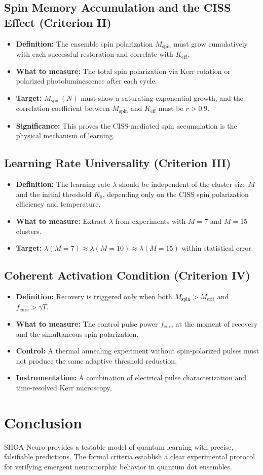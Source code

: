 \documentclass[12pt]{article}
\begin{document}
\subsection{Spin Memory Accumulation and the CISS Effect (Criterion II)}
\begin{itemize}
    \item \textbf{Definition:} The ensemble spin polarization $M_{\text{spin}}$ must grow cumulatively with each successful restoration and correlate with $K_{\text{eff}}$.
    \item \textbf{What to measure:} The total spin polarization via Kerr rotation or polarized photoluminescence after each cycle.
    \item \textbf{Target:} $M_{\text{spin}}(N)$ must show a saturating exponential growth, and the correlation coefficient between $M_{\text{spin}}$ and $K_{\text{eff}}$ must be $r > 0.9$.
    \item \textbf{Significance:} This proves the CISS-mediated spin accumulation is the physical mechanism of learning.
\end{itemize}

\subsection{Learning Rate Universality (Criterion III)}
\begin{itemize}
    \item \textbf{Definition:} The learning rate $\lambda$ should be independent of the cluster size $M$ and the initial threshold $K_0$, depending only on the CISS spin polarization efficiency and temperature.
    \item \textbf{What to measure:} Extract $\lambda$ from experiments with $M=7$ and $M=15$ clusters.
    \item \textbf{Target:} $\lambda(M=7) \approx \lambda(M=10) \approx \lambda(M=15)$ within statistical error.
\end{itemize}

\subsection{Coherent Activation Condition (Criterion IV)}
\begin{itemize}
    \item \textbf{Definition:} Recovery is triggered only when both $M_{\text{spin}} > M_{\text{crit}}$ and $f_{\text{cure}} > \gamma T$.
    \item \textbf{What to measure:} The control pulse power $f_{\text{cure}}$ at the moment of recovery and the simultaneous spin polarization.
    \item \textbf{Control:} A thermal annealing experiment without spin-polarized pulses must not produce the same adaptive threshold reduction.
    \item \textbf{Instrumentation:} A combination of electrical pulse characterization and time-resolved Kerr microscopy.
\end{itemize}

\section{Conclusion}
SHOA-Neuro provides a testable model of quantum learning with precise, falsifiable predictions. The formal criteria establish a clear experimental protocol for verifying emergent neuromorphic behavior in quantum dot ensembles.
\end{document}
